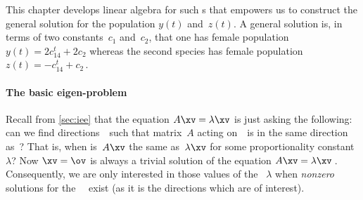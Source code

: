 This chapter develops linear algebra for such s that empowers us to construct the general solution for the population \(y(t)\) and~\(z(t)\). 
A general solution is, in terms of two constants~\(c_1\) and~\(c_2\), that one  has female population \(y(t)=2c_14^t+2c_2\) whereas the second species has female population \(z(t)=-c_14^t+c_2\)\,.

%




\paragraph{The basic eigen-problem}
Recall from \cref{sec:iee} that the  equation \(A\xv=\lambda\xv\) is just asking the following: 
can we find directions~\xv\ such that matrix~\(A\) acting on~\xv\ is in the same direction as~\xv? 
That is, when is~\(A\xv\) the same as~\(\lambda\xv\) for some proportionality constant~\(\lambda\)?
Now \(\xv=\ov\) is always a trivial solution of the  equation \(A\xv=\lambda \xv\)\,.
Consequently, we are only interested in those values of the ~\(\lambda\) when \emph{nonzero} solutions for the ~\xv\ exist (as it is the directions which are of interest).

